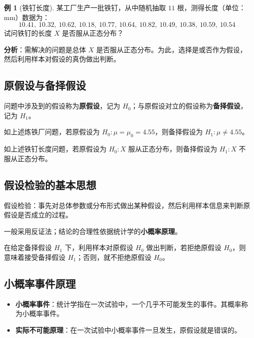 \documentclass[11pt,a4paper]{report}
\theoremstyle{definition}
\newtheorem{example}{例}[chapter]
\begin{document}
\begin{example}[铁钉长度]
某工厂生产一批铁钉，从中随机抽取 $11$ 根，测得长度（单位：mm）数据为：
\[
10.41,\ 10.32,\ 10.62,\ 10.18,\ 10.77,\ 10.64,\ 10.82,\ 10.49,\ 10.38,\ 10.59,\ 10.54
\]
试问铁钉的长度 $X$ 是否服从正态分布？

\textbf{分析}：需解决的问题是总体 $X$ 是否服从正态分布。为此，选择是或否作为假设，然后利用样本对假设的真伪做出判断。
\end{example}

\subsection{原假设与备择假设}

问题中涉及到的假设称为\textbf{原假设}，记为 $H_{0}$；与原假设对立的假设称为\textbf{备择假设}，记为 $H_{1}$。

如上述炼铁厂问题，若原假设为 $H_{0}\colon\mu=\mu_{0}=4.55$，则备择假设为 $H_{1}\colon\mu\neq 4.55$。

如上述铁钉长度问题，若原假设为 $H_{0}\colon X$ 服从正态分布，则备择假设为 $H_{1}\colon X$ 不服从正态分布。

\subsection{假设检验的基本思想}

假设检验：事先对总体参数或分布形式做出某种假设，然后利用样本信息来判断原假设是否成立的过程。

一般采用反证法；结论的合理性依据统计学的\textbf{小概率原理}。

在给定备择假设 $H_{1}$ 下，利用样本对原假设 $H_{0}$ 做出判断，若拒绝原假设 $H_{0}$，则意味着接受备择假设 $H_{1}$；否则，就不拒绝原假设 $H_{0}$。

\subsection{小概率事件原理}

\begin{itemize}[leftmargin=2em]
    \item \textbf{小概率事件}：统计学指在一次试验中，一个几乎不可能发生的事件。其概率称为小概率事件。
    \item \textbf{实际不可能原理}：在一次试验中小概率事件一旦发生，原假设就是错误的。
\end{itemize}
\end{document}
